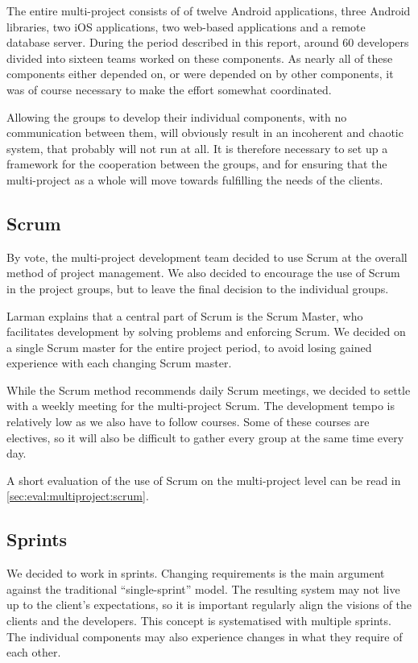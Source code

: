 The entire \giraf multi-project consists of of twelve Android applications, three Android libraries, two iOS applications, two web-based applications and a remote database server.
During the period described in this report, around 60 developers divided into sixteen teams worked on these components. 
As nearly all of these components either depended on, or were depended on by other components, it was of course necessary to make the effort somewhat coordinated. 

Allowing the groups to develop their individual components, with no communication between them, will obviously result in an incoherent and chaotic system, that probably will not run at all. 
It is therefore necessary to set up a framework for the cooperation between the groups, and for ensuring that the multi-project as a whole will move towards fulfilling the needs of the clients.

\subsection{Scrum}
By vote, the multi-project development team decided to use Scrum at the overall method of project management. 
We also decided to encourage the use of Scrum in the project groups, but to leave the final decision to the individual groups. 

Larman \cite{larmanAgile} explains that a central part of Scrum is the Scrum Master, who facilitates development by solving problems and enforcing Scrum. We decided on a single Scrum master for the entire project period, to avoid losing gained experience with each changing Scrum master.

While the Scrum method recommends daily Scrum meetings, we decided to settle with a weekly meeting for the multi-project Scrum. The development tempo is relatively low as we also have to follow courses. Some of these courses are electives, so it will also be difficult to gather every group at the same time every day.

A short evaluation of the use of Scrum on the multi-project level can be read in \cref{sec:eval:multiproject:scrum}.

\subsection{Sprints}
We decided to work in sprints. Changing requirements is the main argument against the traditional ``single-sprint'' model. The resulting system may not live up to the client's expectations, so it is important regularly align the visions of the clients and the developers. This concept is systematised with multiple sprints. The individual components may also experience changes in what they require of each other.

